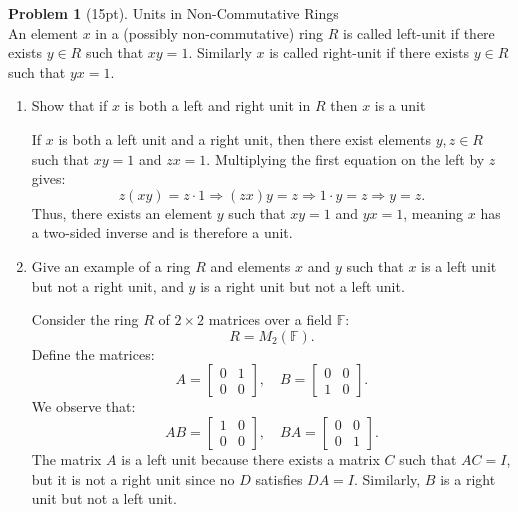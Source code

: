 \documentclass[12pt]{article}
\theoremstyle{definition}
\newtheorem{problem}{Problem}
\begin{document}
\begin{problem}[15pt] Units in Non-Commutative Rings\\
      An element $x$ in a (possibly non-commutative) ring $R$ is called left-unit if
      there exists $y \in R$ such that $xy = 1$. Similarly $x$ is called right-unit if
      there exists $y \in R$ such that $yx = 1$.

      \begin{enumerate}[label=\arabic*.]
            \item Show that if $x$ is both a left and right unit in $R$ then $x$ is a unit
            
            \begin{solution}
                  If $x$ is both a left unit and a right unit, then there exist elements $y, z \in R$ such that $xy = 1$ and $zx = 1$. 
                  Multiplying the first equation on the left by $z$ gives:
                  \[
                  z(xy) = z \cdot 1 \Rightarrow (zx)y = z \Rightarrow 1 \cdot y = z \Rightarrow y = z.
                  \]
                  Thus, there exists an element $y$ such that $xy = 1$ and $yx = 1$, meaning $x$ has a two-sided inverse and is therefore a unit.
            \end{solution}

            \item Give an example of a ring $R$ and elements $x$ and $y$ such that $x$ is a left unit
                  but not a right unit, and $y$ is a right unit but not a left unit.

            \begin{solution}
                  Consider the ring $R$ of $2 \times 2$ matrices over a field $\mathbb{F}$:
                  \[
                  R = M_2(\mathbb{F}).
                  \]
                  Define the matrices:
                  \[
                  A = \begin{bmatrix} 0 & 1 \\ 0 & 0 \end{bmatrix}, \quad B = \begin{bmatrix} 0 & 0 \\ 1 & 0 \end{bmatrix}.
                  \]
                  We observe that:
                  \[
                  A B = \begin{bmatrix} 1 & 0 \\ 0 & 0 \end{bmatrix}, \quad B A = \begin{bmatrix} 0 & 0 \\ 0 & 1 \end{bmatrix}.
                  \]
                  The matrix $A$ is a left unit because there exists a matrix $C$ such that $A C = I$, but it is not a right unit since no $D$ satisfies $D A = I$. Similarly, $B$ is a right unit but not a left unit.
            \end{solution}


\end{enumerate}
\end{problem}
\end{document}
